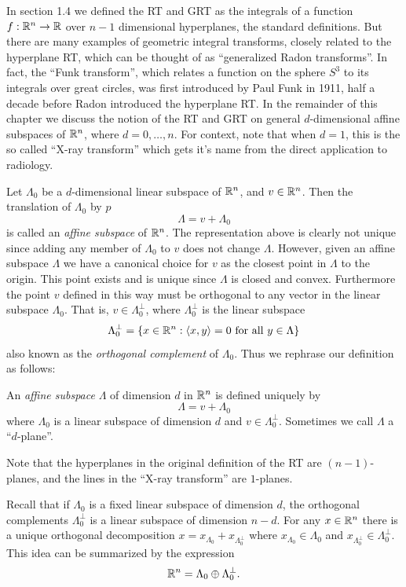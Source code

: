 In section 1.4 we defined the RT and GRT as the integrals of a function $f: \mathbb{R}^n \rightarrow \mathbb{R}$ over $n-1$ dimensional hyperplanes, the standard definitions. But there are many examples of geometric integral transforms, closely related to the hyperplane RT, which can be thought of as ``generalized Radon transforms''. In fact, the ``Funk transform'', which relates a function on the sphere $S^{3}$ to its integrals over great circles, was first introduced by Paul Funk in 1911, half a decade before Radon introduced the hyperplane RT. In the remainder of this chapter we discuss the notion of the RT and GRT on general $d$-dimensional affine subspaces of $\mathbb{R}^n$, where $d = 0, \ldots, n$. For context, note that when $d = 1$, this is the so called ``X-ray transform'' which gets it's name from the direct application to radiology.

Let $\Lambda_0$ be a $d$-dimensional linear subspace of $\mathbb{R}^n$, and $v \in \mathbb{R}^n$. Then the translation of $\Lambda_0$ by $p$
\[
  \Lambda = v + \Lambda_0
\]
is called an \emph{affine subspace} of $\mathbb{R}^n$. The representation above is clearly not unique since adding any member of $\Lambda_0$ to $v$ does not change $\Lambda$. However, given an affine subspace $\Lambda$ we have a canonical choice for $v$ as the closest point in $\Lambda$ to the origin. This point exists and is unique since $\Lambda$ is closed and convex. Furthermore the point $v$ defined in this way must be orthogonal to any vector in the linear subspace $\Lambda_0$. That is, $v \in \Lambda_0^\perp$, where $\Lambda_0^\perp$ is the linear subspace
\[
  \Lambda_0^\perp = \{x \in \mathbb{R}^n : \langle x, y \rangle = 0 \text{ for all } y \in \Lambda\}
\]
also known as the \emph{orthogonal complement} of $\Lambda_0$. Thus we rephrase our definition as follows:

\begin{definition}
  An \emph{affine subspace} $\Lambda$ of dimension $d$ in $\mathbb{R}^n$ is defined uniquely by
  \[
    \Lambda = v + \Lambda_0
  \]
  where $\Lambda_0$ is a linear subspace of dimension $d$ and $v \in \Lambda_0^\perp$. Sometimes we call $\Lambda$ a ``$d$-plane''.
\end{definition}

\begin{remark}
  Note that the hyperplanes in the original definition of the RT are $(n-1)$-planes, and the lines in the ``X-ray transform'' are $1$-planes.
\end{remark}

Recall that if $\Lambda_0$ is a fixed linear subspace of dimension $d$, the orthogonal complements $\Lambda_0^\perp$ is a linear subspace of dimension $n - d$. For any $x \in \mathbb{R}^n$ there is a unique orthogonal decomposition $x = x_{\Lambda_0} + x_{\Lambda_0^\perp}$ where $x_{\Lambda_0} \in \Lambda_0$ and $x_{\Lambda_0^\perp} \in \Lambda_0^\perp$. This idea can be summarized by the expression
\[
  \mathbb{R}^n = \Lambda_0 \oplus \Lambda_0^\perp.
\]

